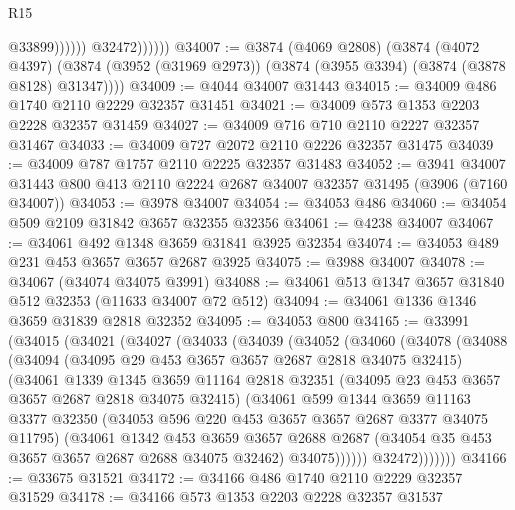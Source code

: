 \begin{lexlean}{R15}
\begin{coremodule}
                            @33899))))))
                @32472))))))
@34007 := @3874
    (@4069 @2808)
    (@3874
      (@4072 @4397)
      (@3874 (@3952 (@31969 @2973)) (@3874 (@3955 @3394) (@3874 (@3878 @8128) @31347))))
@34009 := @4044 @34007 @31443
@34015 := @34009 @486 @1740 @2110 @2229 @32357 @31451
@34021 := @34009 @573 @1353 @2203 @2228 @32357 @31459
@34027 := @34009 @716 @710 @2110 @2227 @32357 @31467
@34033 := @34009 @727 @2072 @2110 @2226 @32357 @31475
@34039 := @34009 @787 @1757 @2110 @2225 @32357 @31483
@34052 := @3941
    @34007
    @31443
    @800
    @413
    @2110
    @2224
    @2687
    @34007
    @32357
    @31495
    (@3906 (@7160 @34007))
@34053 := @3978 @34007
@34054 := @34053 @486
@34060 := @34054 @509 @2109 @31842 @3657 @32355 @32356
@34061 := @4238 @34007
@34067 := @34061 @492 @1348 @3659 @31841 @3925 @32354
@34074 := @34053 @489 @231 @453 @3657 @3657 @2687 @3925
@34075 := @3988 @34007
@34078 := @34067 (@34074 @34075 @3991)
@34088 := @34061 @513 @1347 @3657 @31840 @512 @32353 (@11633 @34007 @72 @512)
@34094 := @34061 @1336 @1346 @3659 @31839 @2818 @32352
@34095 := @34053 @800
@34165 := @33991
    (@34015
      (@34021
        (@34027
          (@34033
            (@34039
              (@34052
                (@34060
                  (@34078
                    (@34088
                      (@34094
                        (@34095 @29 @453 @3657 @3657 @2687 @2818 @34075 @32415)
                        (@34061
                          @1339
                          @1345
                          @3659
                          @11164
                          @2818
                          @32351
                          (@34095 @23 @453 @3657 @3657 @2687 @2818 @34075 @32415)
                          (@34061
                            @599
                            @1344
                            @3659
                            @11163
                            @3377
                            @32350
                            (@34053 @596 @220 @453 @3657 @3657 @2687 @3377 @34075 @11795)
                            (@34061
                              @1342
                              @453
                              @3659
                              @3657
                              @2688
                              @2687
                              (@34054 @35 @453 @3657 @3657 @2687 @2688 @34075 @32462)
                              @34075))))))
                  @32472)))))))
@34166 := @33675 @31521
@34172 := @34166 @486 @1740 @2110 @2229 @32357 @31529
@34178 := @34166 @573 @1353 @2203 @2228 @32357 @31537

\end{coremodule}
\end{lexlean}
